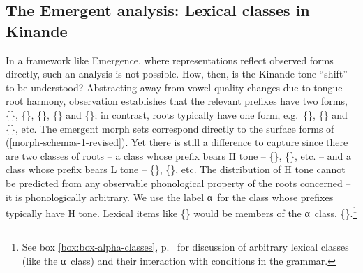 \subsection{The Emergent analysis: Lexical classes in Kinande}

In a framework like Emergence, where representations reflect observed forms directly, such an analysis is not possible. How, then, is the Kinande tone ``shift'' to be understood? Abstracting away from vowel quality changes due to tongue root harmony, observation establishes that the relevant prefixes have two forms, \{\}, \{\}, \{\}, \{\} and \{{}\}; in contrast, roots typically have one form, e.g.\  \{\}, \{\} and \{\}, etc. The emergent morph sets correspond directly to the surface forms of (\ref{morph-schemas-1-revised}). Yet there is still a  difference to capture since there are two classes of roots -- a class whose prefix bears  H tone --  \{\}, \{\}, etc. -- and a class whose prefix bears L tone -- \{\}, \{\},  etc. The  distribution of H tone cannot be predicted from any observable phonological property of the roots concerned -- it is phonologically arbitrary.   We use the label α\ for the class whose prefixes  typically have H tone. Lexical items like \{\} would be members of the α\ class, \{\}.\footnote{See box \ref{box:box-alpha-classes}, p.\ \pageref{box:box-alpha-classes} for discussion of arbitrary lexical classes (like the α\ class) and their interaction with conditions in the grammar.}\largerpage

